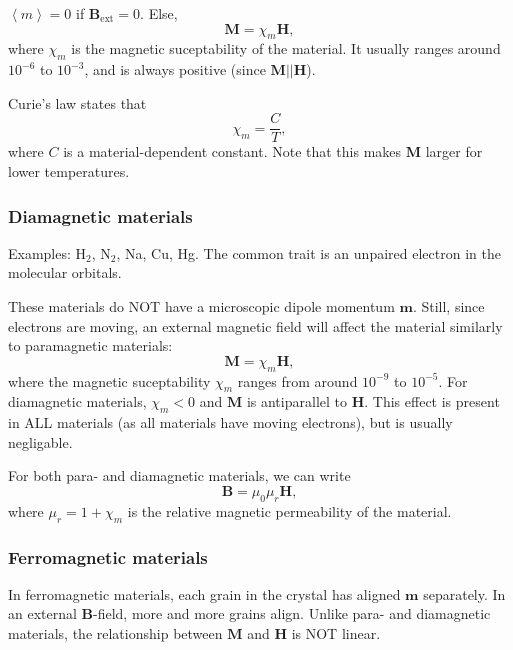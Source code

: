 \documentclass[a4paper, 12pt]{article}
\renewcommand{\vec}[1]{\mathbf{#1}}
\newcommand{\B}{\ensuremath{\vec{B}}}
\renewcommand{\H}{\ensuremath{\vec{H}}}
\begin{document}
            $\left<m\right>=0$ if $\B_{\text{ext}} = 0$. Else, 
            \begin{equation}
                \vec{M} = \chi_m\H,
            \end{equation}
            where $\chi_m$ is the magnetic suceptability of the material. 
            It usually ranges around $10^{-6}$ to $10^{-3}$, and is always positive (since $\vec{M} || \H$).

            Curie's law states that 
            \begin{equation}
                \chi_m = \frac{C}{T}, 
            \end{equation}
            where $C$ is a material-dependent constant. Note that this makes $\vec{M}$ larger for lower temperatures.

        \subsubsection{Diamagnetic materials}
            Examples: $\text{H}_2$, $\text{N}_2$, Na, Cu, Hg. The common trait is an unpaired electron in the molecular orbitals.
            
            These materials do NOT have a microscopic dipole momentum $\vec{m}$. Still, since electrons are moving, 
            an external magnetic field will affect the material similarly to paramagnetic materials:
            \begin{equation}
                \vec{M} = \chi_m\H,
            \end{equation}
            where the magnetic suceptability $\chi_m$ ranges from around $10^{-9}$ to $10^{-5}$. 
            For diamagnetic materials, $\chi_m < 0$ and $\vec{M}$ is antiparallel to \H. 
            This effect is present in ALL materials (as all materials have moving electrons), but is usually negligable.
        
        For both para- and diamagnetic materials, we can write
        \begin{equation}
            \B = \mu_0 \mu_r \H,
        \end{equation}
        where $\mu_r = 1+\chi_m$ is the relative magnetic permeability of the material.
        
        \subsubsection{Ferromagnetic materials}
            In ferromagnetic materials, each grain in the crystal has aligned $\vec{m}$ separately. 
            In an external \B-field, more and more grains align. 
            Unlike para- and diamagnetic materials, the relationship between $\vec{M}$ and \H{} is NOT linear.
\end{document}

